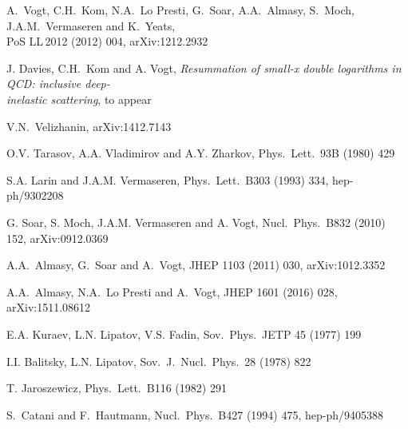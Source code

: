 \documentclass[12pt]{article}
\begin{document}
{\begin{thebibliography}{99}
A.~Vogt, C.H.~Kom, N.A.~Lo Presti, G.~Soar, A.A.~Almasy, S.~Moch, 
  J.A.M.~Vermaseren and K.~Yeats, \\[1mm]
  PoS LL$\,$2012 (2012) 004, arXiv:1212.2932

J. Davies, C.H.~Kom and A. Vogt,
  {\it Resummation of small-x double logarithms in QCD: 
  inclusive deep-\\[1mm] inelastic scattering}, to appear

  V.N.~Velizhanin,
  arXiv:1412.7143

O.V. Tarasov, A.A. Vladimirov and A.Y. Zharkov,
  Phys.\ Lett.\ 93B (1980) 429

S.A. Larin and J.A.M. Vermaseren,
  Phys.\ Lett.\ B303 (1993) 334, hep-ph/9302208

G. Soar, S. Moch, J.A.M. Vermaseren and A. Vogt,
  Nucl.\ Phys.\ B832 (2010) 152, arXiv:0912.0369 %

A.A.~Almasy, G.~Soar and A.~Vogt,
  JHEP 1103 (2011) 030, arXiv:1012.3352

A.A.~Almasy, N.A.~Lo Presti and A.~Vogt,
  JHEP 1601 (2016) 028, arXiv:1511.08612

E.A. Kuraev, L.N. Lipatov, V.S. Fadin,
  Sov.\ Phys.\ JETP 45 (1977) 199

I.I. Balitsky, L.N. Lipatov,
  Sov.\ J.\ Nucl.\ Phys.\ 28 (1978) 822

T. Jaroszewicz,
  Phys.\ Lett.\ B116 (1982) 291

S.~Catani and F.~Hautmann,
  Nucl.\ Phys.\ B427 (1994) 475, hep-ph/9405388


\end{thebibliography}
}
\end{document}
